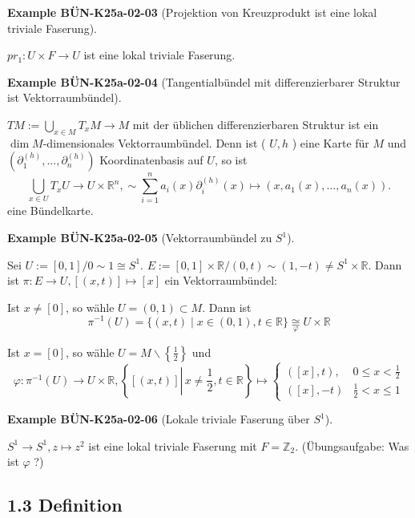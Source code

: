 \documentclass[10pt, letterpaper]{article}
\newcommand{\CustomHeading}[3]{%
  \par\medskip\noindent%
  \textbf{#1 #2} \textnormal{(#3)}.\enskip%
}
\newenvironment{EXA}[2]{\begin{unitbox}\CustomHeading{Example}{#1}{#2}}{\end{unitbox}}
\begin{document}
\begin{EXA}{BÜN-K25a-02-03}{Projektion von Kreuzprodukt ist eine lokal triviale Faserung}
$p r_{1}: U \times F \rightarrow U$ ist eine lokal triviale Faserung.
\end{EXA}


\begin{EXA}{BÜN-K25a-02-04}{Tangentialbündel mit differenzierbarer Struktur ist Vektorraumbündel}
$T M:=\bigcup_{x \in M} T_{x} M \rightarrow M$ mit der üblichen differenzierbaren Struktur ist ein $\operatorname{dim} M$-dimensionales Vektorraumbündel. Denn ist ( $U, h$ ) eine Karte für $M$ und $\left(\partial_{1}^{(h)}, \ldots, \partial_{n}^{(h)}\right)$ Koordinatenbasis auf $U$, so ist
$$
\bigcup_{x \in U} T_{x} U \rightarrow U \times \mathbb{R}^{n}, \sim \sum_{i=1}^{n} a_{i}(x) \partial_{i}^{(h)}(x) \mapsto\left(x, a_{1}(x), \ldots, a_{n}(x)\right) .
$$
eine Bündelkarte.
\end{EXA}



\begin{EXA}{BÜN-K25a-02-05}{Vektorraumbündel zu $S^1$}
Sei $U:=[0,1] / 0 \sim 1 \cong S^{1}$. $E:=[0,1] \times \mathbb{R} /(0, t) \sim(1,-t) \neq S^{1} \times \mathbb{R}$. Dann ist $\pi: E \rightarrow U,[(x, t)] \mapsto[x]$ ein Vektorraumbündel:

Ist $x \neq[0]$, so wähle $U=(0,1) \subset M$. Dann ist
$$
\pi^{-1}(U)=\{(x, t) \mid x \in(0,1), t \in \mathbb{R}\} \underset{\varphi}{\cong} U \times \mathbb{R}
$$

Ist $x=[0]$, so wähle $U=M \backslash\left\{\frac{1}{2}\right\}$ und
$$
\varphi: \pi^{-1}(U) \rightarrow U \times \mathbb{R},\left\{[(x, t)] \left\lvert\, x \neq \frac{1}{2}\right., t \in \mathbb{R}\right\} \mapsto \begin{cases}([x], t), & 0 \leq x<\frac{1}{2} \\ ([x],-t) & \frac{1}{2}<x \leq 1\end{cases}
$$
\end{EXA}


\begin{EXA}{BÜN-K25a-02-06}{Lokale triviale Faserung über $S^1$}
$S^{1} \rightarrow S^{1}, z \mapsto z^{2}$ ist eine lokal triviale Faserung mit $F=\mathbb{Z}_{2}$. (Übungsaufgabe: Was ist $\varphi$ ?)
\end{EXA}

\subsection*{1.3 Definition}
\end{document}
